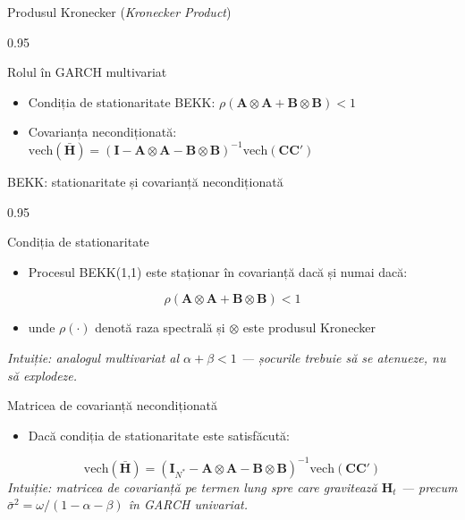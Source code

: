 \documentclass[9pt, aspectratio=169, t]{beamer}
\begin{document}
\begin{frame}{Produsul Kronecker (\textit{Kronecker Product})}
\begin{cminipage}{0.95\textwidth}
{\begin{alertblock}{Rolul în GARCH multivariat}
        \begin{itemize}\setlength{\itemsep}{0pt}
            \item Condiția de stationaritate BEKK: $\rho(\mathbf{A} \otimes \mathbf{A} + \mathbf{B} \otimes \mathbf{B}) < 1$
            \item Covarianța necondiționată: $\text{vech}(\bar{\mathbf{H}}) = (\mathbf{I} - \mathbf{A} \otimes \mathbf{A} - \mathbf{B} \otimes \mathbf{B})^{-1}\text{vech}(\mathbf{C}\mathbf{C}')$
        \end{itemize}
    \end{alertblock}
    }
    \end{cminipage}
\end{frame}

\begin{frame}{BEKK: stationaritate și covarianță necondiționată}
    \begin{cminipage}{0.95\textwidth}
    {\footnotesize
    \begin{block}{Condiția de stationaritate}
        \begin{itemize}\setlength{\itemsep}{0pt}
            \item Procesul BEKK(1,1) este staționar în covarianță dacă și numai dacă:
        \end{itemize}
        \[
            \rho(\mathbf{A} \otimes \mathbf{A} + \mathbf{B} \otimes \mathbf{B}) < 1
        \]
        \begin{itemize}\setlength{\itemsep}{0pt}
            \item unde $\rho(\cdot)$ denotă raza spectrală și $\otimes$ este produsul Kronecker
        \end{itemize}
        \textit{Intuiție: analogul multivariat al $\alpha + \beta < 1$ --- șocurile trebuie să se atenueze, nu să explodeze.}
    \end{block}
    \vspace{0.1cm}
    \begin{block}{Matricea de covarianță necondiționată}
        \begin{itemize}\setlength{\itemsep}{0pt}
            \item Dacă condiția de stationaritate este satisfăcută:
        \end{itemize}
        \[
            \text{vech}(\bar{\mathbf{H}}) = (\mathbf{I}_{N^*} - \mathbf{A} \otimes \mathbf{A} - \mathbf{B} \otimes \mathbf{B})^{-1} \text{vech}(\mathbf{C}\mathbf{C}')
        \]
        \textit{Intuiție: matricea de covarianță pe termen lung spre care gravitează $\mathbf{H}_t$ --- precum $\bar{\sigma}^2 = \omega/(1-\alpha-\beta)$ în GARCH univariat.}
    \end{block}
    }
    \end{cminipage}
\end{frame}
\end{document}
